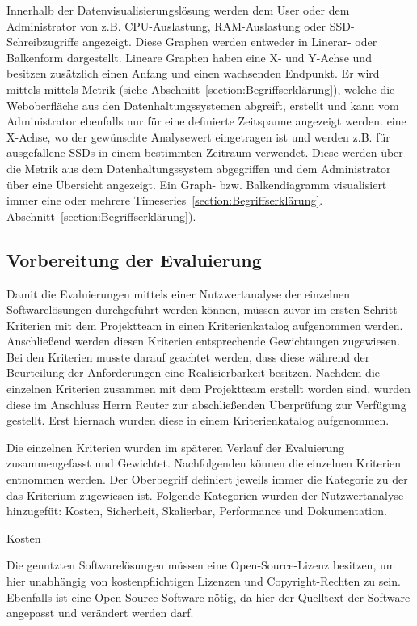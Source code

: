 {Innerhalb der Datenvisualisierungslösung werden dem User oder dem Administrator
von z.B. CPU\hyp{}Auslastung, RAM\hyp{}Auslastung oder SSD-Schreibzugriffe angezeigt.
Diese Graphen werden entweder in Linerar- oder Balkenform dargestellt. Lineare
Graphen haben eine X- und Y-Achse und besitzen zusätzlich einen Anfang und
einen wachsenden Endpunkt. Er wird mittels
mittels Metrik (siehe Abschnitt~\ref{section:Begriffserklärung}), welche die
Weboberfläche aus den Datenhaltungssystemen abgreift, erstellt und kann vom
Administrator ebenfalls nur für eine definierte Zeitspanne angezeigt werden.
eine X\hyp{}Achse, wo der gewünschte Analysewert eingetragen ist und werden z.B. für
ausgefallene SSDs in einem bestimmten Zeitraum verwendet. Diese werden über die
Metrik aus dem Datenhaltungssystem abgegriffen und dem Administrator über eine
Übersicht angezeigt. Ein Graph- bzw. Balkendiagramm visualisiert immer eine
oder mehrere Timeseries~\ref{section:Begriffserklärung}.
Abschnitt~\ref{section:Begriffserklärung}).

\subsection{Vorbereitung der Evaluierung}
\label{subsec:vorbereiten_der_evaluierung_datenvisualisierung}
Damit die Evaluierungen mittels einer Nutzwertanalyse der einzelnen
Softwarelösungen durchgeführt werden können, müssen zuvor im ersten Schritt
Kriterien mit dem Projektteam in einen Kriterienkatalog aufgenommen werden.
Anschließend werden diesen Kriterien entsprechende Gewichtungen zugewiesen. Bei
den Kriterien musste darauf geachtet werden, dass diese während der Beurteilung
der Anforderungen eine Realisierbarkeit besitzen. Nachdem die einzelnen
Kriterien zusammen mit dem Projektteam erstellt worden sind, wurden diese im
Anschluss Herrn Reuter zur abschließenden Überprüfung zur Verfügung gestellt.
Erst hiernach wurden diese in einem Kriterienkatalog aufgenommen.

Die einzelnen Kriterien wurden im späteren Verlauf der Evaluierung
zusammengefasst und Gewichtet. Nachfolgenden können die einzelnen Kriterien
entnommen werden. Der Oberbegriff definiert jeweils immer die Kategorie zu der
das Kriterium zugewiesen ist. Folgende Kategorien wurden der Nutzwertanalyse
hinzugefüt: Kosten, Sicherheit, Skalierbar, Performance und Dokumentation.

Kosten
\begin{outline}
  \1 Die genutzten Softwarelösungen müssen eine Open\hyp{}Source\hyp{}Lizenz besitzen, um
  hier unabhängig von kostenpflichtigen Lizenzen und Copyright\hyp{}Rechten zu sein.
  Ebenfalls ist eine Open\hyp{}Source\hyp{}Software nötig, da hier der Quelltext der
  Software angepasst und verändert werden darf.
\end{outline}

}
